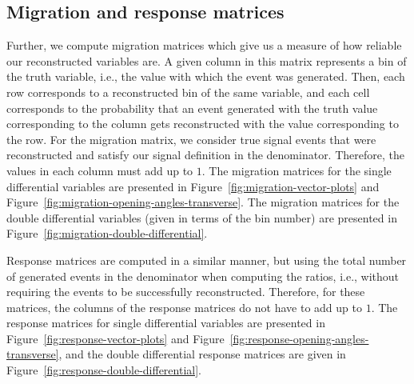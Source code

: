 \documentclass{article}
\begin{document}
\clearpage
\subsection{Migration and response matrices}

Further, we compute migration matrices which give us a measure of how reliable our reconstructed variables are. A given column in this matrix represents a bin of the truth variable, i.e., the value with which the event was generated. Then, each row corresponds to a reconstructed bin of the same variable, and each cell corresponds to the probability that an event generated with the truth value corresponding to the column gets reconstructed with the value corresponding to the row. For the migration matrix, we consider true signal events that were reconstructed and satisfy our signal definition in the denominator. Therefore, the values in each column must add up to $1$. The migration matrices for the single differential variables are presented in Figure~\ref{fig:migration-vector-plots} and Figure~\ref{fig:migration-opening-angles-transverse}. The migration matrices for the double differential variables (given in terms of the bin number) are presented in Figure~\ref{fig:migration-double-differential}.

Response matrices are computed in a similar manner, but using the total number of generated events in the denominator when computing the ratios, i.e., without requiring the events to be successfully reconstructed. Therefore, for these matrices, the columns of the response matrices do not have to add up to $1$. The response matrices for single differential variables are presented in Figure~\ref{fig:response-vector-plots} and Figure~\ref{fig:response-opening-angles-transverse}, and the double differential response matrices are given in Figure~\ref{fig:response-double-differential}.
\end{document}
